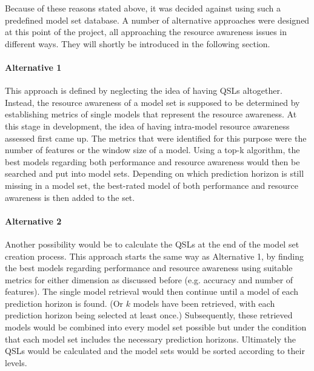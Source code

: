 Because of these reasons stated above, it was decided against using such a predefined model set database. A number of alternative approaches were designed at this point of the project, all approaching the resource awareness issues in different ways. They will shortly be introduced in the following section. 

\paragraph*{Alternative 1}
This approach is defined by neglecting the idea of having QSLs altogether. Instead, the resource awareness of a model set is supposed to be determined by establishing metrics of single models that represent the resource awareness. At this stage in development, the idea of having intra-model resource awareness assessed first came up. The metrics that were identified for this purpose were the number of features or the window size of a model. Using a top-k algorithm, the best models regarding both performance and resource awareness would then be searched and put into model sets. Depending on which prediction horizon is still missing in a model set, the best-rated model of both performance and resource awareness is then added to the set. 

\paragraph{Alternative 2}
Another possibility would be to calculate the QSLs at the end of the model set creation process. This approach starts the same way as Alternative 1, by finding the best models regarding performance and resource awareness using suitable metrics for either dimension as discussed before (e.g. accuracy and number of features). The single model retrieval would then continue until a model of each prediction horizon is found. (Or $k$ models have been retrieved, with each prediction horizon being selected at least once.) Subsequently, these retrieved models would be combined into every model set possible but under the condition that each model set includes the necessary prediction horizons. Ultimately the QSLs would be calculated and the model sets would be sorted according to their levels.

